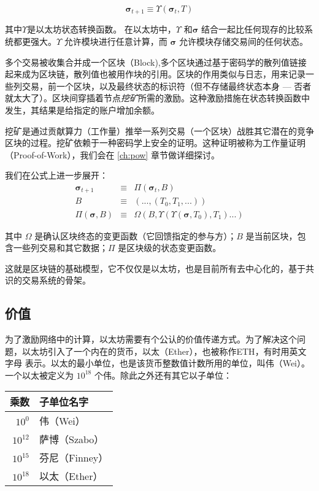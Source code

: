 \documentclass[UTF8,nofonts]{ctexart}
\begin{document}
\begin{multicols}{2}
\begin{equation}
\boldsymbol{\sigma}_{t+1} \equiv \Upsilon(\boldsymbol{\sigma}_t, T)
\end{equation}

其中$\Upsilon$是以太坊状态转换函数。 在以太坊中，$\Upsilon$ 和$\boldsymbol{\sigma}$ 结合一起比任何现存的比较系统都更强大。$\Upsilon$ 允许模块进行任意计算，而 $\boldsymbol{\sigma}$ 允许模块存储交易间的任何状态。

多个交易被收集合并成一个区块（Block),多个区块通过基于密码学的散列值链接起来成为区块链，散列值也被用作块的引用。区块的作用类似与日志，用来记录一些列交易，前一个区块，以及最终状态的标识符（但不存储最终状态本身 --- 否者就太大了）。区块间穿插着节点\textit{挖矿}所需的激励。这种激励措施在状态转换函数中发生，其结果是给指定的账户增加余额。

挖矿是通过贡献算力（工作量）推举一系列交易（一个区块）战胜其它潜在的竞争区块的过程。挖矿依赖于一种密码学上安全的证明。这种证明被称为工作量证明（Proof-of-Work），我们会在 \ref{ch:pow} 章节做详细探讨。

我们在公式上进一步展开：
\begin{eqnarray}
\boldsymbol{\sigma}_{t+1} & \equiv & \Pi(\boldsymbol{\sigma}_t, B) \\
B & \equiv & (..., (T_0, T_1, ...) ) \\
\Pi(\boldsymbol{\sigma}, B) & \equiv & \Omega(B, \Upsilon(\Upsilon(\boldsymbol{\sigma}, T_0), T_1) ...)
\end{eqnarray}

其中 $\Omega$ 是确认区块终态的变更函数（它回馈指定的参与方）；$B$ 是当前区块，包含一些列交易和其它数据；$\Pi$ 是区块级的状态变更函数。

这就是区块链的基础模型，它不仅仅是以太坊，也是目前所有去中心化的，基于共识的交易系统的骨架。


\subsection{价值}

为了激励网络中的计算，以太坊需要有个公认的价值传递方式。为了解决这个问题，以太坊引入了一个内在的货币，以太（Ether），也被称作{\small ETH}，有时用英文字母 \DH{}表示。以太的最小单位，也是该货币整数值计数所用的单位，叫伟（Wei）。一个以太被定义为 $10^{18}$ 个伟。除此之外还有其它以子单位：

\par
\begin{center}
\begin{tabular}{rl}
\toprule
乘数 & 子单位名字 \\
\midrule
$10^0$ & 伟（Wei） \\
$10^{12}$ & 萨博（Szabo） \\
$10^{15}$ & 芬尼（Finney） \\
$10^{18}$ & 以太（Ether） \\
\bottomrule
\end{tabular}
\end{center}
\par



\end{multicols}
\end{document}
